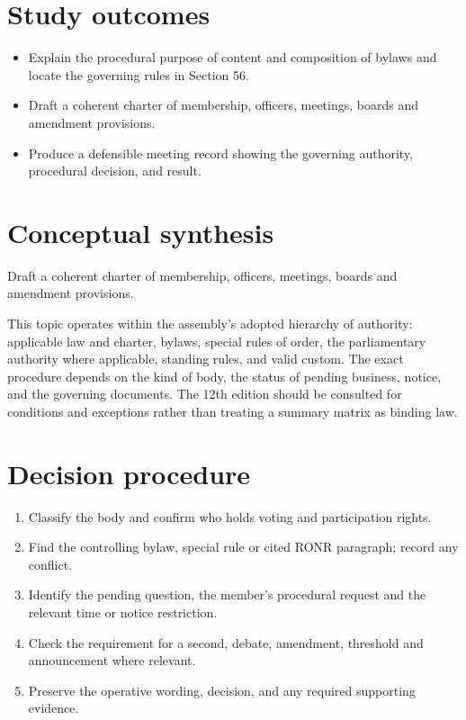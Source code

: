 \documentclass[11pt]{article}
\begin{document}
\SuiteOpen
{}
\section{Study outcomes}
\begin{itemize}[leftmargin=*,itemsep=4pt]
\item Explain the procedural purpose of content and composition of bylaws and locate the governing rules in Section 56.
\item Draft a coherent charter of membership, officers, meetings, boards and amendment provisions.
\item Produce a defensible meeting record showing the governing authority, procedural decision, and result.
\end{itemize}

\section{Conceptual synthesis}
Draft a coherent charter of membership, officers, meetings, boards and amendment provisions.

This topic operates within the assembly’s adopted hierarchy of authority: applicable law and charter, bylaws, special rules of order, the parliamentary authority where applicable, standing rules, and valid custom. The exact procedure depends on the kind of body, the status of pending business, notice, and the governing documents. The 12th edition should be consulted for conditions and exceptions rather than treating a summary matrix as binding law.
\section{Decision procedure}
\begin{enumerate}[leftmargin=*,itemsep=4pt]
\item Classify the body and confirm who holds voting and participation rights.
\item Find the controlling bylaw, special rule or cited RONR paragraph; record any conflict.
\item Identify the pending question, the member’s procedural request and the relevant time or notice restriction.
\item Check the requirement for a second, debate, amendment, threshold and announcement where relevant.
\item Preserve the operative wording, decision, and any required supporting evidence.
\end{enumerate}
\end{document}
